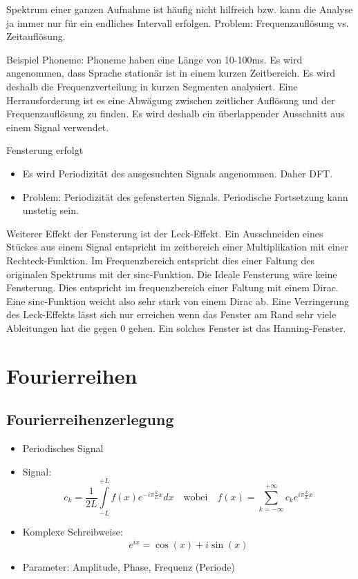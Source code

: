 Spektrum einer ganzen Aufnahme ist häufig nicht hilfreich bzw. kann die Analyse ja immer nur für ein endliches Intervall erfolgen. Problem: Frequenzauflösung vs. Zeitauflösung.

Beispiel Phoneme: Phoneme haben eine Länge von 10-100ms. Es wird angenommen, dass Sprache stationär ist in einem kurzen Zeitbereich. Es wird deshalb die Frequenzverteilung in kurzen Segmenten analysiert. Eine Herrausforderung ist es eine Abwägung zwischen zeitlicher Auflösung und der Frequenzauflösung zu finden. Es wird deshalb ein überlappender Ausschnitt aus einem Signal verwendet.

Fensterung erfolgt
\begin{itemize}
	\item Es wird Periodizität des ausgesuchten Signals angenommen. Daher DFT.
	\item Problem: Periodizität des gefensterten Signals. Periodische Fortsetzung kann unstetig sein.
\end{itemize}
Weiterer Effekt der Fensterung ist der Leck-Effekt. Ein Ausschneiden eines Stückes aus einem Signal entspricht im zeitbereich einer Multiplikation mit einer Rechteck-Funktion. Im Frequenzbereich entspricht dies einer Faltung des originalen Spektrums mit der sinc-Funktion. Die Ideale Fensterung wäre keine Fensterung. Dies entspricht im frequenzbereich einer Faltung mit einem Dirac. Eine sinc-Funktion weicht also sehr stark von einem Dirac ab. Eine Verringerung des Leck-Effekts lässt sich nur erreichen wenn das Fenster am Rand sehr viele Ableitungen hat die gegen 0 gehen. Ein solches Fenster ist das Hanning-Fenster.

\section{Fourierreihen}

\subsection{Fourierreihenzerlegung}
\begin{itemize}
\item Periodisches Signal
\item Signal: $$c_k = \frac{1}{2L} \int\limits_{-L}^{+L} f(x) e^{-i \pi \frac{k}{L} x} dx \quad \textrm{wobei} \quad f(x) = \sum\limits_{k=- \infty}^{+ \infty} c_k e^{i \pi \frac{k}{L} x}$$
\item Komplexe Schreibweise: $$e^{ix} = \cos(x) + i \sin(x)$$
\item Parameter: Amplitude, Phase, Frequenz (Periode)
\end{itemize}

